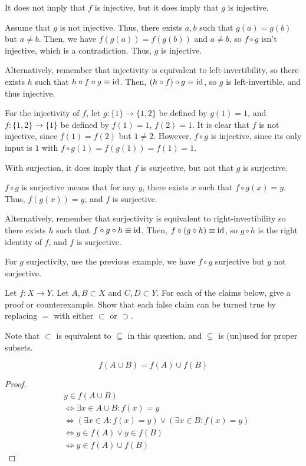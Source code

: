 \documentclass[12pt]{article}
\begin{document}
It does not imply that $f$ is injective,
but it does imply that $g$ is injective.

Assume that $g$ is not injective. Thus, there exists
$a,b$ such that $g(a) = g(b)$ but $a \ne b$.
Then, we have $f(g(a)) = f(g(b))$ and $a \ne b$, so $f \circ g$
isn't injective, which is a contradiction.
Thus, $g$ is injective.

Alternatively, remember that injectivity
is equivalent to left-invertibility, so 
there exists $h$ such that $h \circ f \circ g \equiv \operatorname{id}_{}$.
Then, $(h \circ f) \circ g \equiv \operatorname{id}_{}$, so $g$ is left-invertible,
and thus injective.

For the injectivity of $f$,
let $g : \{1\} \to \{1,2\}$ be defined by $g(1) = 1$,
and $f : \{1,2\} \to \{1\}$ be defined by $f(1) = 1$, $f(2) = 1$.
It is clear that $f$ is not injective, since $f(1) = f(2)$ but $1 \ne 2$.
However, $f \circ g$ is injective, since its only input is $1$
with $f \circ g(1) = f(g(1)) = f(1) = 1$.

With surjection, it does imply that $f$ is surjective,
but not that $g$ is surjective.

$f \circ g$ is surjective means that for any $y$,
there exists $x$ such that $f \circ g(x) = y$.
Thus, $f(g(x)) = y$, and $f$ is surjective.

Alternatively, remember that surjectivity
is equivalent to right-invertibility
so there exists $h$ such that $f \circ g \circ h \equiv \operatorname{id}_{}$.
Then, $f \circ (g \circ h) \equiv \operatorname{id}_{}$, so $g \circ h$ is the
right identity of $f$, and $f$ is surjective.

For $g$ surjectivity, use the previous example,
we have $f \circ g$ surjective but $g$ not surjective.

\begin{question}
    Let $f : X \to Y$. Let $A,B \subset X$ and $C,D \subset Y$.
    For each of the claims below, give a proof or counterexample.
    Show that each false claim can be turned true
    by replacing $=$ with either $\subset$ or $\supset$.
\end{question}

Note that $\subset$ is equivalent to $\subseteq$
in this question, and $\subsetneq$ is (un)used for proper subsets.

\begin{claim*}[i]
\[
f(A \cup B) = f(A) \cup f(B)
\]
\end{claim*}
\begin{proof}
    \begin{align*}
        &y \in f(A \cup B)\\
        &\iff \exists x \in A \cup B : f(x) = y\\
        &\iff (\exists x \in A : f(x) = y) \lor (\exists x \in B : f(x) = y)\\
        &\iff y \in f(A) \lor y \in f(B)\\
        &\iff y \in f(A) \cup f(B)
    \end{align*}
\end{proof}
\end{document}
